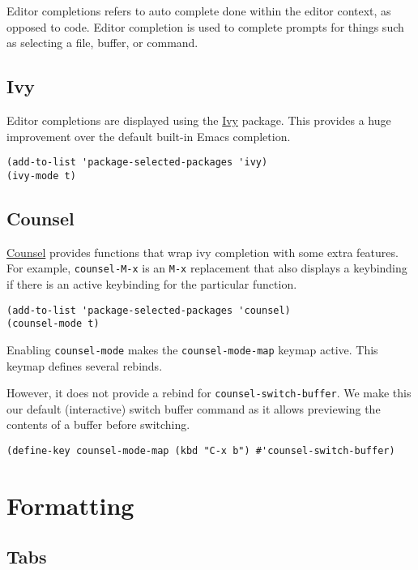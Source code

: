 \documentclass[11pt]{article}
\begin{document}
Editor completions refers to auto complete done within the editor context, as
opposed to code. Editor completion is used to complete prompts for things such
as selecting a file, buffer, or command.
\subsection{Ivy}
\label{sec:org538c76d}

Editor completions are displayed using the \href{https://github.com/abo-abo/swiper?tab=readme-ov-file\#ivy}{Ivy} package. This provides a huge
improvement over the default built-in Emacs completion.

\begin{verbatim}
(add-to-list 'package-selected-packages 'ivy)
(ivy-mode t)
\end{verbatim}
\subsection{Counsel}
\label{sec:orgb5e94f4}

\href{https://github.com/abo-abo/swiper?tab=readme-ov-file\#counsel}{Counsel} provides functions that wrap ivy completion with some extra
features. For example, \texttt{counsel-M-x} is an \texttt{M-x} replacement that also displays
a keybinding if there is an active keybinding for the particular function.

\begin{verbatim}
(add-to-list 'package-selected-packages 'counsel)
(counsel-mode t)
\end{verbatim}

Enabling \texttt{counsel-mode} makes the \texttt{counsel-mode-map} keymap active. This keymap
defines several rebinds.


However, it does not provide a rebind for \texttt{counsel-switch-buffer}. We make this
our default (interactive) switch buffer command as it allows previewing the
contents of a buffer before switching.

\begin{verbatim}
(define-key counsel-mode-map (kbd "C-x b") #'counsel-switch-buffer)
\end{verbatim}
\section{Formatting}
\label{sec:org0b5f1bd}

\subsection{Tabs}
\label{sec:orgb1dcd13}
\end{document}
